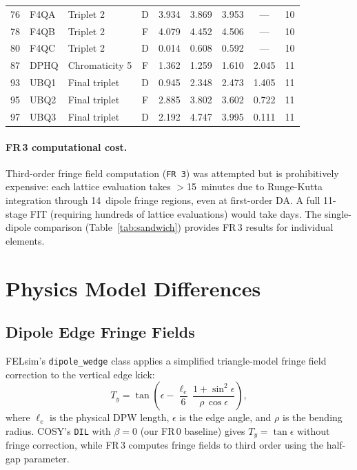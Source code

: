 \documentclass[11pt]{article}
\begin{document}
\begin{table}[h]
\begin{tabular}{@{} c l l c SSSS c @{}}
76  & F4QA  & Triplet 2         & D &  3.934 &  3.869 &  3.953 & {---} & 10 \\
78  & F4QB  & Triplet 2         & F &  4.079 &  4.452 &  4.506 & {---} & 10 \\
80  & F4QC  & Triplet 2         & D &  0.014 &  0.608 &  0.592 & {---} & 10 \\
87  & DPHQ  & Chromaticity 5    & F &  1.362 &  1.259 &  1.610 &  2.045 & 11 \\
93  & UBQ1  & Final triplet     & D &  0.945 &  2.348 &  2.473 &  1.405 & 11 \\
95  & UBQ2  & Final triplet     & F &  2.885 &  3.802 &  3.602 &  0.722 & 11 \\
97  & UBQ3  & Final triplet     & D &  2.192 &  4.747 &  3.995 &  0.111 & 11 \\
\bottomrule
\end{tabular}
\end{table}

\paragraph{FR\,3 computational cost.}
Third-order fringe field computation (\texttt{FR\,3}) was attempted but
is prohibitively expensive: each lattice evaluation takes $>$15~minutes
due to Runge-Kutta integration through 14~dipole fringe regions, even at
first-order DA. A full 11-stage FIT (requiring hundreds of lattice
evaluations) would take days. The single-dipole comparison
(Table~\ref{tab:sandwich}) provides FR\,3 results for individual elements.


\section{Physics Model Differences}
\label{sec:physics}

\subsection{Dipole Edge Fringe Fields}

FELsim's \texttt{dipole\_wedge} class applies a simplified triangle-model
fringe field correction to the vertical edge kick:
\begin{equation}
  T_y = \tan\!\left(\epsilon - \frac{\ell_e}{6}\,\frac{1+\sin^2\!\epsilon}
        {\rho\,\cos\epsilon}\right),
\end{equation}
where $\ell_e$ is the physical DPW length, $\epsilon$ is the edge angle,
and $\rho$ is the bending radius. COSY's \texttt{DIL} with $\beta=0$
(our FR\,0 baseline) gives $T_y = \tan\epsilon$ without fringe correction,
while FR\,3 computes fringe fields to third order using the half-gap
parameter.
\end{document}
